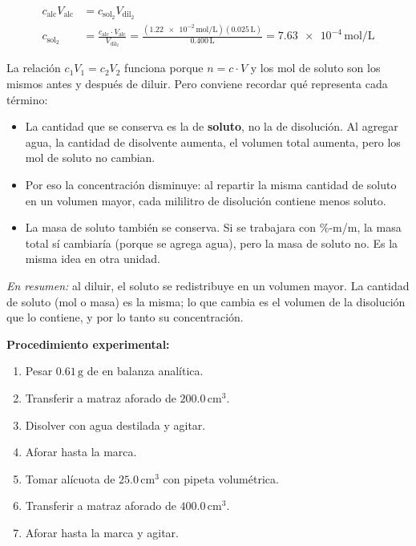 \begin{exercise}{}{}
\begin{align*}
    c_{\mathrm{alc}} V_{\mathrm{alc}} &= c_{\mathrm{sol_2}} V_{\mathrm{dil_2}} \\[4pt]
    c_{\mathrm{sol_2}} &= \frac{c_{\mathrm{alc}} \cdot V_{\mathrm{alc}}}{V_{\mathrm{dil_2}}}
    = \frac{(\num{1.22e-2}\,\mathrm{mol/L})(0.025\,\mathrm{L})}{0.400\,\mathrm{L}}
    = \num{7.63e-4}\,\mathrm{mol/L}
\end{align*}

La relación $c_1 V_1 = c_2 V_2$ funciona porque $n = c \cdot V$ y los mol 
de soluto son los mismos antes y después de diluir. Pero conviene recordar qué 
representa cada término:

\begin{itemize}
    \item La cantidad que se conserva es la de \textbf{soluto}, no la de 
    disolución. Al agregar agua, la cantidad de disolvente aumenta, el volumen 
    total aumenta, pero los mol de soluto no cambian.
    \item Por eso la concentración disminuye: al repartir la misma cantidad 
    de soluto en un volumen mayor, cada mililitro de disolución contiene menos 
    soluto.
    \item La masa de soluto también se conserva. Si se trabajara con \%-m/m, 
    la masa total sí cambiaría (porque se agrega agua), pero la masa de soluto 
    no. Es la misma idea en otra unidad.
\end{itemize}

\textit{En resumen:} al diluir, el soluto se redistribuye en un volumen mayor. 
La cantidad de soluto (mol o masa) es la misma; lo que cambia es el volumen 
de la disolución que lo contiene, y por lo tanto su concentración.

\textbf{Procedimiento experimental:}
\begin{enumerate}
    \item Pesar $0.61\,\mathrm{g}$ de  en balanza analítica.
    \item Transferir a matraz aforado de $200.0\,\mathrm{cm^3}$.
    \item Disolver con agua destilada y agitar.
    \item Aforar hasta la marca.
    \item Tomar alícuota de $25.0\,\mathrm{cm^3}$ con pipeta volumétrica.
    \item Transferir a matraz aforado de $400.0\,\mathrm{cm^3}$.
    \item Aforar hasta la marca y agitar.
\end{enumerate}
\end{exercise}


